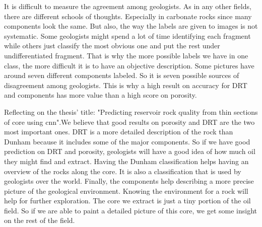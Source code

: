 It is difficult to measure the agreement among geologists. As in any other fields, there are different schools of thoughts. Especially in carbonate rocks since many components look the same. But also, the way the labels are given to images is not systematic. Some geologists might spend a lot of time identifying each fragment while others just classify the most obvious one and put the rest under undifferentiated fragment. That is why the more possible labels we have in one class, the more difficult it is to have an objective description. Some pictures have around seven different components labeled. So it is seven possible sources of disagreement among geologists. This is why a high result on accuracy for DRT and components has more value than a high score on porosity. 


Reflecting on the thesis' title: "Predicting reservoir rock quality from thin sections of core using \gls{cnn}".We believe that good results on porosity and DRT are the two most important ones. DRT is a more detailed description of the rock than Dunham because it includes some of the major components. So if we have good prediction on DRT and porosity, geologists will have a good idea of how much oil they might find and extract. Having the Dunham classification helps having an overview of the rocks along the core. It is also a classification that is used by geologists over the world. Finally, the components help describing a more precise picture of the geological environment. Knowing the environment for a rock will help for further exploration. The core we extract is just a tiny portion of the oil field. So if we are able to paint a detailed picture of this core, we get some insight on the rest of the field. 